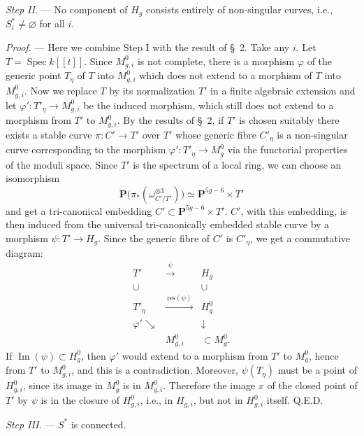 \documentclass[10pt]{article}
\newcommand{\Spec}{\operatorname{Spec}}
\newcommand{\PP}{\mathbf P}
\begin{document}
\medskip
\noindent\emph{Step II.} --- No component of $H_g$ consists entirely of non-singular curves, i.e., $S_i^*\ne\varnothing$ for all $i$.

\noindent\emph{Proof.} --- Here we combine Step I with the result of \S~2. Take any $i$. Let $T=\Spec k[[t]]$. Since $M^0_{g,i}$ is not complete, there is a morphism $\varphi$ of the generic point $T_\eta$ of $T$ into $M^0_{g,i}$ which does not extend to a morphism of $T$ into $M^0_{g,i}$. Now we replace $T$ by its normalization $T'$ in a finite algebraic extension and let $\varphi':T'_\eta\to M^0_{g,i}$ be the induced morphism, which still does not extend to a morphism from $T'$ to $M^0_{g,i}$. By the results of \S~2, if $T'$ is chosen suitably there exists a stable curve $\pi:C'\to T'$ over $T'$ whose generic fibre $C'_\eta$ is a non-singular curve corresponding to the morphism $\varphi':T'_\eta\to M_g^0$ via the functorial properties of the moduli space. Since $T'$ is the spectrum of a local ring, we can choose an isomorphism
\[
\PP\bigl(\pi_*(\omega_{C'/T'}^{\otimes3})\bigr)\simeq\PP^{5g-6}\times T'
\]
and get a tri-canonical embedding $C'\subset\PP^{5g-6}\times T'$. $C'$, with this embedding, is then induced from the universal tri-canonically embedded stable curve by a morphism $\psi:T'\to H_g$. Since the generic fibre of $C'$ is $C'_\eta$, we get a commutative diagram:
\[
\begin{array}{ccc}
T'&\xrightarrow{\ \psi\ }&H_g\\
\cup&&\cup\\
T'_\eta&\xrightarrow{\ \mathrm{res}(\psi)\ }&H_g^0\\
\varphi'\searrow&&\downarrow\\
& M^0_{g,i}&\subset M_g^0.
\end{array}
\]
If $\operatorname{Im}(\psi)\subset H_g^0$, then $\varphi'$ would extend to a morphism from $T'$ to $M_g^0$, hence from $T'$ to $M^0_{g,i}$, and this is a contradiction. Moreover, $\psi(T_\eta)$ must be a point of $H^0_{g,i}$, since its image in $M_g^0$ is in $M^0_{g,i}$. Therefore the image $x$ of the closed point of $T'$ by $\psi$ is in the closure of $H^0_{g,i}$, i.e., in $H_{g,i}$, but not in $H^0_{g,i}$ itself. Q.E.D.

\medskip
\noindent\emph{Step III.} --- $S^*$ is connected.
\end{document}
